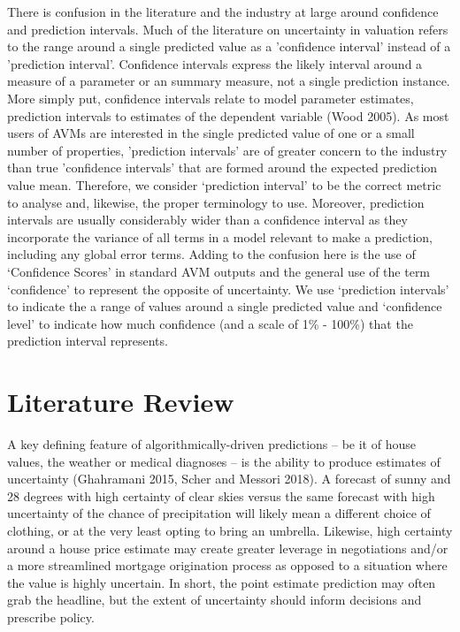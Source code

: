 \documentclass[colTwo]{anon}
\theoremstyle{definition}
\begin{document}
There is confusion in the literature and the industry at large around confidence and prediction intervals. Much of the literature on uncertainty in valuation refers to the range around a single predicted value as a 'confidence interval' instead of a 'prediction interval'.  Confidence intervals express the likely interval around a measure of a parameter or an summary measure, not a single prediction instance. More simply put, confidence intervals relate to model parameter estimates, prediction intervals to estimates of the dependent variable (Wood 2005). As most users of AVMs are interested in the single predicted value of one or a small number of properties, 'prediction intervals' are of greater concern to the industry than true 'confidence intervals' that are formed around the expected prediction value mean. Therefore, we consider ‘prediction interval’ to be the correct metric to analyse and, likewise, the proper terminology to use.  Moreover, prediction intervals are usually considerably wider than a confidence interval as they incorporate the variance of all terms in a model relevant to make a prediction, including any global error terms. Adding to the confusion here is the use of ‘Confidence Scores’ in standard AVM outputs and the general use of the term ‘confidence’ to represent the opposite of uncertainty. We use ‘prediction intervals’ to indicate the a range of values around a single predicted value and ‘confidence level’ to indicate how much confidence (and a scale of 1\% - 100\%) that the prediction interval represents.

\section{Literature Review}

A key defining feature of algorithmically-driven predictions -- be it of house values, the weather or medical diagnoses -- is the ability to produce estimates of uncertainty (Ghahramani 2015, Scher and Messori 2018).  A forecast of sunny and 28 degrees with high certainty of clear skies versus the same forecast with high uncertainty of the chance of precipitation will likely mean a different choice of clothing, or at the very least opting to bring an umbrella.  Likewise, high certainty around a house price estimate may create greater leverage in negotiations and/or a more streamlined mortgage origination process as opposed to a situation where the value is highly uncertain.  In short, the point estimate prediction may often grab the headline, but the extent of uncertainty should inform decisions and prescribe policy.
\end{document}
